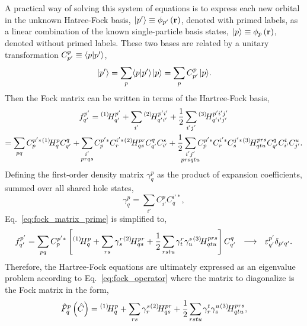 \documentclass[thesis.tex]{subfiles}
\begin{document}
A practical way of solving this system of equations is to express each new orbital in the unknown Hatree-Fock basis, $\hspace{1pt}\lvert p' \rangle \equiv \phi_{p'}\left(\mathbf{r}\right)$, denoted with primed labels, as a linear combination of the known single-particle basis states, $\hspace{1pt}\lvert p \rangle \equiv \phi_{p}\left(\mathbf{r}\right)$, denoted without primed labels.  These two bases are related by a unitary transformation $C^{p}_{p'} \equiv \langle p | p'\rangle$,
\begin{equation} \label{eq:fock_matrix_prime}
  \hspace{1pt}\lvert p' \rangle = \sum_{p}\langle p | p'\rangle\hspace{1pt}\lvert p \rangle = \sum_{p}C^{p}_{p'}\hspace{1pt}\lvert p \rangle.
\end{equation}
Then the Fock matrix can be written in terms of the Hartree-Fock basis,
\begin{gather}
  \fint{p'}{q'} = \Hint{1}{p'}{q'} + \sum_{\mathclap{i'}}\Hint{2}{p'i'}{q'i'} + \frac{1}{2}\sum_{\mathclap{i'j'}}\Hint{3}{p'i'j'}{q'i'j'} \notag \\
  = \sum_{\mathclap{pq}}C^{p'*}_{p}\Hint{1}{p}{q}C^{q}_{q'} + \sum_{\mathclap{\substack{i' \\ prqs}}}C^{p'*}_{p}C^{i'*}_{r}\Hint{2}{pr}{qs}C^{q}_{q'}C^{s}_{i'} + \frac{1}{2}\sum_{\mathclap{\substack{i'j' \\ prsqtu}}}C^{p'*}_{p}C^{i'*}_{r}C^{j'*}_{s}\Hint{3}{prs}{qtu}C^{q}_{q'}C^{t}_{i'}C^{u}_{j'}.
\end{gather}
Defining the first-order density matrix $\gamma^{p}_{q}$ as the product of expansion coefficients, summed over all shared hole states,
\begin{equation}
  \gamma^{p}_{q} = \sum_{i'}C^{p}_{i'}C^{i'*}_{q},
\end{equation}
Eq.\ \eqref{eq:fock_matrix_prime} is simplified to,
\begin{equation}
  \fint{p'}{q'} = \sum_{\mathclap{pq}}C^{p'*}_{p}\left[ \Hint{1}{p}{q} + \sum_{\mathclap{rs}}\gamma^{r}_{s}\Hint{2}{pr}{qs} + \frac{1}{2}\sum_{\mathclap{rstu}}\gamma^{r}_{t}\gamma^{s}_{u}\Hint{3}{prs}{qtu} \right]C^{q}_{q'}\ \ \longrightarrow\ \ \varepsilon^{p'}_{q'}\delta_{p'q'}.
\end{equation}
Therefore, the Hartree-Fock equations are ultimately expressed as an eigenvalue problem according to Eq.\ \eqref{eq:fock_operator} where the matrix to diagonalize is the Fock matrix in the form,
\begin{equation}
  \hat{F}^{p}_{q}\left(\hat{C}\right) = \Hint{1}{p}{q} + \sum_{\mathclap{rs}}\gamma^{s}_{r}\Hint{2}{pr}{qs} + \frac{1}{2}\sum_{\mathclap{rstu}}\gamma^{t}_{r}\gamma^{u}_{s}\Hint{3}{prs}{qtu},
\end{equation}
\end{document}
